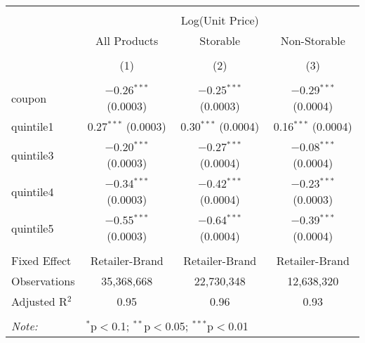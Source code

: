 
\begin{table}[!htbp] \centering 
  \caption{} 
  \label{tab:overallSavings} 
\begin{tabular}{@{\extracolsep{5pt}}lccc} 
\\[-1.8ex]\hline 
\hline \\[-1.8ex] 
 & \multicolumn{3}{c}{Log(Unit Price)} \\ 
\cline{2-4} 
 & All Products & Storable & Non-Storable \\ 
\\[-1.8ex] & (1) & (2) & (3)\\ 
\hline \\[-1.8ex] 
 coupon & $-$0.26$^{***}$ (0.0003) & $-$0.25$^{***}$ (0.0003) & $-$0.29$^{***}$ (0.0004) \\ 
  quintile1 & 0.27$^{***}$ (0.0003) & 0.30$^{***}$ (0.0004) & 0.16$^{***}$ (0.0004) \\ 
  quintile3 & $-$0.20$^{***}$ (0.0003) & $-$0.27$^{***}$ (0.0004) & $-$0.08$^{***}$ (0.0004) \\ 
  quintile4 & $-$0.34$^{***}$ (0.0003) & $-$0.42$^{***}$ (0.0004) & $-$0.23$^{***}$ (0.0003) \\ 
  quintile5 & $-$0.55$^{***}$ (0.0003) & $-$0.64$^{***}$ (0.0004) & $-$0.39$^{***}$ (0.0004) \\ 
 \hline \\[-1.8ex] 
Fixed Effect & Retailer-Brand & Retailer-Brand & Retailer-Brand \\ 
Observations & 35,368,668 & 22,730,348 & 12,638,320 \\ 
Adjusted R$^{2}$ & 0.95 & 0.96 & 0.93 \\ 
\hline 
\hline \\[-1.8ex] 
\textit{Note:}  & \multicolumn{3}{l}{$^{*}$p$<$0.1; $^{**}$p$<$0.05; $^{***}$p$<$0.01} \\ 
\end{tabular} 
\end{table} 
